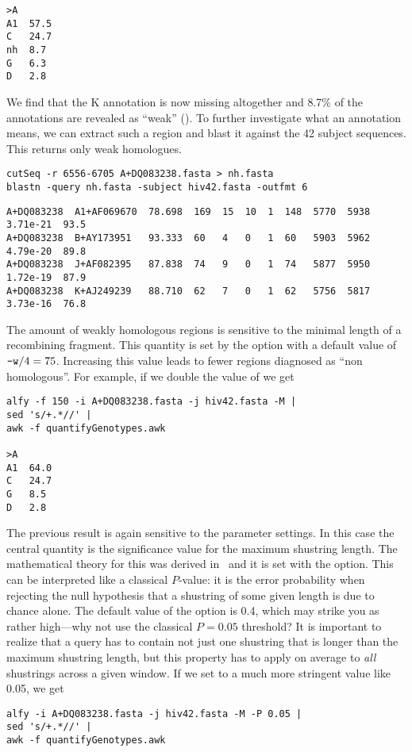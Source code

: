 \documentclass[a4paper]{article}
\begin{document}
\begin{itemize}
\begin{verbatim}
>A
A1  57.5
C   24.7
nh  8.7
G   6.3
D   2.8
\end{verbatim}
We find that the K annotation  is now missing altogether and 8.7\% of
the annotations are revealed as ``weak'' ().
\I To further investigate what an  annotation means, we can
extract such a region and blast it against the 42 subject
sequences. This returns only weak homologues.
\begin{verbatim}
cutSeq -r 6556-6705 A+DQ083238.fasta > nh.fasta
blastn -query nh.fasta -subject hiv42.fasta -outfmt 6  
\end{verbatim}
\footnotesize
\begin{verbatim}
A+DQ083238  A1+AF069670  78.698  169  15  10  1  148  5770  5938  3.71e-21  93.5
A+DQ083238  B+AY173951   93.333  60   4   0   1  60   5903  5962  4.79e-20  89.8
A+DQ083238  J+AF082395   87.838  74   9   0   1  74   5877  5950  1.72e-19  87.9
A+DQ083238  K+AJ249239   88.710  62   7   0   1  62   5756  5817  3.73e-16  76.8
\end{verbatim}
\normalsize
\I The amount of weakly homologous regions is sensitive to the minimal
length of a recombining fragment. This quantity is set by the 
option with a default value of $\texttt{-w}/4=75$. Increasing this value
leads to fewer regions diagnosed as ``non homologous''. For example,
if we double the value of  we get
\begin{verbatim}
alfy -f 150 -i A+DQ083238.fasta -j hiv42.fasta -M |
sed 's/+.*//' | 
awk -f quantifyGenotypes.awk

>A
A1  64.0
C   24.7
G   8.5
D   2.8
\end{verbatim}

\I The previous result is again sensitive to the parameter
settings. In this case the central quantity is the significance value
for the maximum shustring length. The mathematical theory for this was
derived in~\cite{hau09:est} and it is set with the 
option. This can be interpreted like a classical $P$-value: it is the
error probability when rejecting the null hypothesis that a shustring
of some given length is due to chance alone. The default value of the
 option is 0.4, which may strike you as rather high---why not
use the classical $P=0.05$ threshold? It is important to realize that
a query has to contain not just one shustring that is longer than the
maximum shustring length, but this property has to apply on average to
\textit{all} shustrings across a given window. If we set  to a
much more stringent value like 0.05, we get
\begin{verbatim}
alfy -i A+DQ083238.fasta -j hiv42.fasta -M -P 0.05 | 
sed 's/+.*//' | 
awk -f quantifyGenotypes.awk


\end{verbatim}
\end{itemize}
\end{document}
